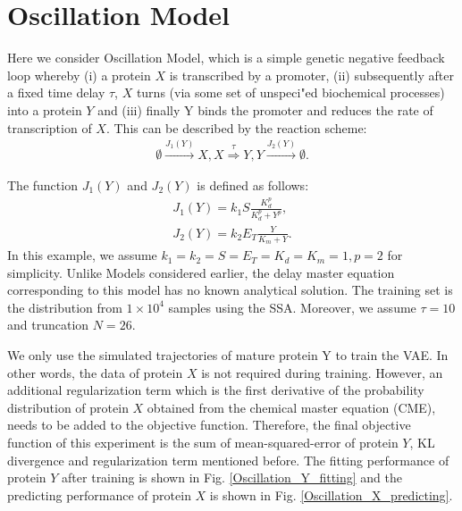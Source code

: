 \documentclass[a4paper,10pt]{article}
\begin{document}
\section{Oscillation Model}
Here we consider Oscillation Model, which is a simple genetic negative feedback loop whereby (i) a protein $X$ is transcribed by a promoter, (ii) subsequently after a fixed time delay $\tau$, $X$ turns (via some set of unspeci"ed biochemical processes) into a protein $Y$ and (iii) finally Y binds the promoter and reduces the rate of transcription of $X$. This can be described by the reaction scheme:
\begin{equation}\label{oscillation}
	\begin{aligned}
		\emptyset \xrightarrow{J_1(Y)} X,
		X\stackrel{\tau}\Rightarrow Y,
		Y\xrightarrow{J_2(Y)} \emptyset.
	\end{aligned}
\end{equation}

The function $J_1(Y)$ and $J_2(Y)$ is defined as follows:
\begin{equation}\label{oscillation}
	\begin{aligned}
	J_1(Y)=k_1S\frac{K^p_d}{K^p_d+Y^p},\\
	J_2(Y)=k_2E_T\frac{Y}{K_m+Y}.
	\end{aligned}
\end{equation}
In this example, we assume $k_1=k_2=S=E_T=K_d=K_m=1, p=2$ for simplicity. Unlike Models considered earlier, the delay master equation corresponding to this model has no known analytical solution. The training set is the distribution from $1 \times 10^4$ samples using the SSA. Moreover, we assume $\tau=10$ and truncation $N=26$.

We only use the simulated trajectories of mature protein Y to train the VAE. In other words, the data of protein $X$ is not required during training. However, an additional regularization term which is the first derivative of the probability distribution of protein $X$ obtained from the chemical master equation (CME), needs to be added to the objective function. Therefore, the final objective function of this experiment is the sum of mean-squared-error of protein $Y$, KL divergence and regularization term mentioned before. The fitting performance of protein $Y$ after training is shown in Fig. \ref{Oscillation_Y_fitting} and the predicting performance of protein $X$ is shown in Fig. \ref{Oscillation_X_predicting}.
\end{document}
